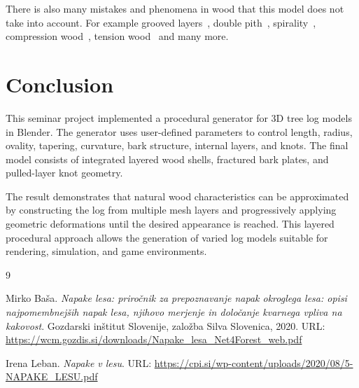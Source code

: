 \documentclass{egpubl}
\begin{document}
There is also many mistakes and phenomena in wood that this model does not take into account. For example grooved layers~\cite{lebanNapakeLesu}, double pith~\cite{lebanNapakeLesu}, spirality~\cite{lebanNapakeLesu}, compression wood~\cite{lebanNapakeLesu}, tension wood~\cite{lebanNapakeLesu} and many more.


\section{Conclusion}

This seminar project implemented a procedural generator for 3D tree log models in Blender. The generator uses user-defined parameters to control length, radius, ovality, tapering, curvature, bark structure, internal layers, and knots. The final model consists of integrated layered wood shells, fractured bark plates, and pulled-layer knot geometry.

The result demonstrates that natural wood characteristics can be approximated by constructing the log from multiple mesh layers and progressively applying geometric deformations until the desired appearance is reached. This layered procedural approach allows the generation of varied log models suitable for rendering, simulation, and game environments.


\begin{thebibliography}{9}

Mirko Ba\v{s}a.
\newblock \emph{Napake lesa: priro\v{c}nik za prepoznavanje napak okroglega lesa: opisi najpomembnej\v{s}ih napak lesa, njihovo merjenje in dolo\v{c}anje kvarnega vpliva na kakovost}.
\newblock Gozdarski in\v{s}titut Slovenije, zalo\v{z}ba Silva Slovenica, 2020.
\newblock URL: \url{https://wcm.gozdis.si/downloads/Napake_lesa_Net4Forest_web.pdf}

Irena Leban.
\newblock \emph{Napake v lesu}.
\newblock URL: \url{https://cpi.si/wp-content/uploads/2020/08/5-NAPAKE_LESU.pdf}

\end{thebibliography}
\end{document}

